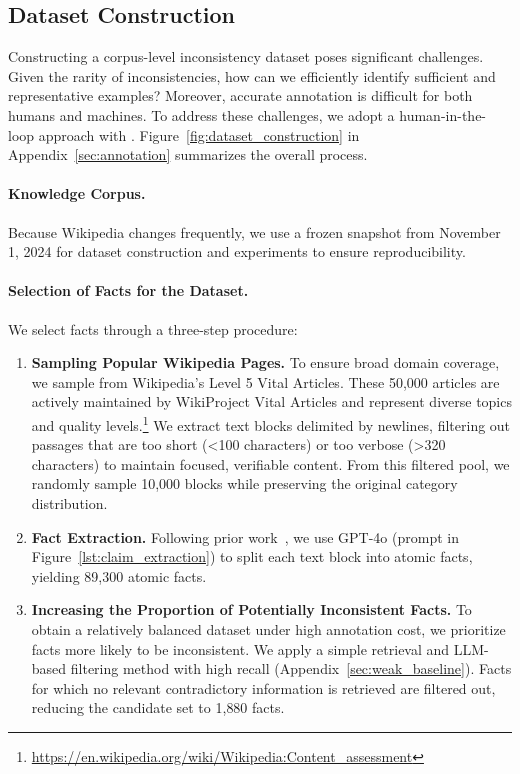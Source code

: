 \subsection{Dataset Construction}

Constructing a corpus-level inconsistency dataset poses significant challenges. Given the rarity of inconsistencies, how can we efficiently identify sufficient and representative examples? Moreover, accurate annotation is difficult for both humans and machines. To address these challenges, we adopt a human-in-the-loop approach with \system. Figure~\ref{fig:dataset_construction} in Appendix~\ref{sec:annotation} summarizes the overall process.

\paragraph{Knowledge Corpus.} Because Wikipedia changes frequently, we use a frozen snapshot from November 1, 2024 for dataset construction and experiments to ensure reproducibility.

\paragraph{Selection of Facts for the Dataset.} We select facts through a three-step procedure:

\begin{enumerate}
\item \textbf{Sampling Popular Wikipedia Pages.} To ensure broad domain coverage, we sample from Wikipedia's Level 5 Vital Articles. These 50{,}000 articles are actively maintained by WikiProject Vital Articles and represent diverse topics and quality levels.\footnote{\url{https://en.wikipedia.org/wiki/Wikipedia:Content_assessment}} We extract text blocks delimited by newlines, filtering out passages that are too short (<100 characters) or too verbose (>320 characters) to maintain focused, verifiable content. From this filtered pool, we randomly sample 10{,}000 blocks while preserving the original category distribution.

\item \textbf{Fact Extraction.} Following prior work~\citep{semnani-etal-2023-wikichat}, we use GPT-4o (prompt in Figure~\ref{lst:claim_extraction}) to split each text block into atomic facts, yielding 89{,}300 atomic facts.

\item \textbf{Increasing the Proportion of Potentially Inconsistent Facts.} To obtain a relatively balanced dataset under high annotation cost, we prioritize facts more likely to be inconsistent. We apply a simple retrieval and LLM-based filtering method with high recall (Appendix~\ref{sec:weak_baseline}). Facts for which no relevant contradictory information is retrieved are filtered out, reducing the candidate set to 1{,}880 facts.
\end{enumerate}

